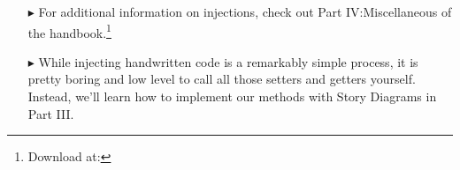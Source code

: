 \begin{itemize}
\item[$\blacktriangleright$] For additional information on injections, check out Part IV:Miscellaneous of the handbook.\footnote{Download at: \dlPartSix}

\vspace{0.5cm}

\item[$\blacktriangleright$] While injecting handwritten code is a remarkably simple process, it is pretty boring and low level to call all those setters and
getters yourself. Instead, we'll learn how to implement our methods with Story Diagrams in Part III.

 
\end{itemize}
